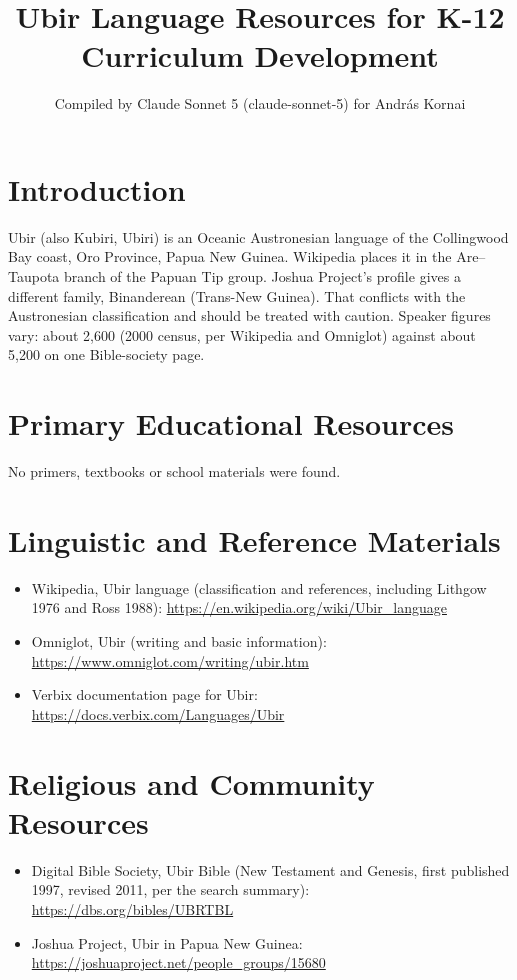\documentclass[12pt]{article}
\title{Ubir Language Resources for K-12 Curriculum Development}
\author{Compiled by Claude Sonnet 5 (claude-sonnet-5) for Andr\'as Kornai}
\date{}
\begin{document}
\maketitle

\section{Introduction}
Ubir (also Kubiri, Ubiri) is an Oceanic Austronesian language of the Collingwood Bay coast, Oro Province, Papua New Guinea. Wikipedia places it in the Are--Taupota branch of the Papuan Tip group. Joshua Project's profile gives a different family, Binanderean (Trans-New Guinea). That conflicts with the Austronesian classification and should be treated with caution. Speaker figures vary: about 2,600 (2000 census, per Wikipedia and Omniglot) against about 5,200 on one Bible-society page.

\section{Primary Educational Resources}
No primers, textbooks or school materials were found.

\section{Linguistic and Reference Materials}
\begin{itemize}
\item Wikipedia, Ubir language (classification and references, including Lithgow 1976 and Ross 1988): \url{https://en.wikipedia.org/wiki/Ubir_language}
\item Omniglot, Ubir (writing and basic information): \url{https://www.omniglot.com/writing/ubir.htm}
\item Verbix documentation page for Ubir: \url{https://docs.verbix.com/Languages/Ubir}
\end{itemize}

\section{Religious and Community Resources}
\begin{itemize}
\item Digital Bible Society, Ubir Bible (New Testament and Genesis, first published 1997, revised 2011, per the search summary): \url{https://dbs.org/bibles/UBRTBL}
\item Joshua Project, Ubir in Papua New Guinea: \url{https://joshuaproject.net/people_groups/15680}
\end{itemize}
\end{document}

